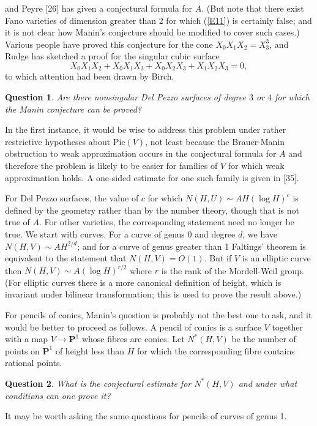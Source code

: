 \documentclass[12pt]{article}
\def\bP{{\mathbf P}}
\def\bpr{\begin{question} \label}
\def\epr{\end{question}}
\newtheorem{question}{Question}
\begin{document}
and Peyre [26] has given a conjectural formula for $A$. (But note that there
exist
Fano varieties of dimension greater than 2 for which (\ref{E11}) is certainly
false; and it is not clear how Manin's conjecture should be modified to
cover such cases.) Various people have proved
this conjecture
for the cone $X_0X_1X_2=X_3^3$, and Rudge has sketched a proof for the
singular cubic surface
\[ X_0X_1X_2+X_0X_1X_3+X_0X_2X_3+X_1X_2X_3=0, \]
to which attention had been drawn by Birch.
\bpr{Q15} Are there nonsingular Del Pezzo surfaces of degree $3$ or $4$ for
which the Manin conjecture can be proved?
\epr
In the first instance, it would be wise to address this problem under rather
restrictive hypotheses about Pic$(V)$, not least because the Brauer-Manin
obstruction to weak approximation occurs in the conjectural formula for $A$
and therefore the problem is likely to be easier for families of $V$ for
which weak approximation holds. A one-sided estimate for one such family is
given in [35].

For Del Pezzo surfaces, the value of $c$ for which
$N(H,U)\sim AH(\log H)^c$ is defined by the geometry rather than by the
number theory, though that is not true of $A$. For other varieties, the
corresponding statement need no longer be true. We start with curves. For a
curve of genus 0 and degree $d$, we have $N(H,V)\sim AH^{2/d}$; and for a
curve of genus greater than 1 Faltings' theorem is equivalent to the
statement that $N(H,V)=O(1)$. But if $V$ is an elliptic curve then $N(H,V)\sim
A(\log H)^{r/2}$ where $r$ is the rank of the Mordell-Weil group. (For elliptic
curves there is a more canonical definition of height, which is invariant
under bilinear transformation; this is used to prove the result above.)

For pencils of conics, Manin's question is probably not the best one to ask,
and it would be better to proceed as follows. A pencil of conics is a surface
$V$ together with a map $V\rightarrow\bP^1$ whose fibres are conics. Let
$N^*(H,V)$ be the number of points on $\bP^1$ of height less than $H$ for
which the corresponding fibre contains rational points.
\bpr{Q16} What is the conjectural estimate for $N^*(H,V)$ and under what
conditions can one prove it?
\epr
It may be worth asking the same questions for pencils of curves of genus
1.
\end{document}
